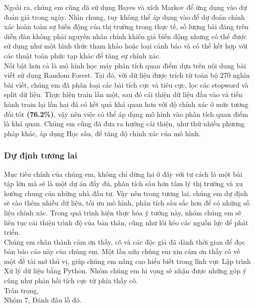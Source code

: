Ngoài ra, chúng em cũng đã sử dụng Bayes và xích Markov để ứng dụng vào dự đoán giá trong ngày. Nhìn chung, tuy không thể áp dụng vào để dự đoán chính xác hoàn toàn sự biến động của thị trường trong thực tế, số lượng bài đăng trên diễn đàn không phải nguyên nhân chính khiến giá biến động nhưng có thể được sử dụng như một hình thức tham khảo hoặc loại cảnh báo và có thể kết hợp với các thuật toán phức tạp khác để tăng sự chính xác.\\

Nối bật hơn cả là mô hình học máy phân tích quan điểm dựa trên nội dung bài viết sử dụng Random Forest. Tại đó, với dữ liệu được trích từ toàn bộ 270 nghìn bài viết, chúng em đã phân loại các bài tích cực và tiêu cực, lọc các stopword và split dữ liệu. Thực hiện train lần một, sau đó cải thiện dữ liệu đầu vào và tiến hành train lại lần hai đã có kết quả khả quan hơn với độ chính xác ở mức tương đối tốt \textbf{(76.2\%)}, vậy nên việc có thể áp dụng mô hình vào phân tích quan điểm là khả quan. Chúng em cũng đã đưa ra hướng cải thiện, như thử nhiều phương pháp khác, áp dụng Học sâu, để tăng độ chính xác của mô hình.\\

\subsubsection*{Dự định tương lai}
Mục tiêu chính của chúng em, không chỉ dừng lại ở đây với tư cách là một bài tập lớn mà sẽ là một dự án đầy đủ, phân tích sâu hơn tâm lý thị trường và xu hướng chung của những nhà đầu tư. Vậy nên trong tương lai, chúng em dự định sẽ cào thêm nhiều dữ liệu, tối ưu mô hình, phân tích sâu sắc hơn để có những số liệu chính xác. Trong quá trình hiện thực hóa ý tưởng này, nhóm chúng em sẽ liên tục cải thiện trình độ của bản thân, cũng như lôi kéo các nguồn lực để phát triển.\\

\large{
Chúng em chân thành cảm ơn thầy, cô và các độc giả đã dành thời gian để đọc bản báo cáo này của chúng em. Một lần nữa chúng em xin cảm ơn thầy cô về một đề tài mở thú vị, giúp chúng em nâng cao hiểu biết trong lĩnh vực Lập trình Xử lý dữ liệu bằng Python. Nhóm chúng em hi vọng sẽ nhận được những góp ý cũng như phản hồi tích cực từ phía thầy cô.\\ 

\noindent Trân trọng, \\

\noindent Nhóm 7, Đánh đâu lỗ đó.
}